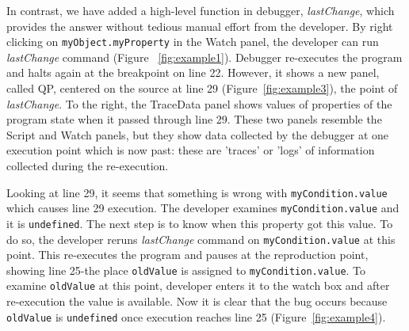 \documentclass[runningheads,a4paper]{llncs}
\begin{document}
In contrast, we have added a high-level function in debugger,
\textit{lastChange}, which provides the answer without tedious manual
effort from the developer. By right clicking on
\texttt{myObject.myProperty} in the Watch panel, the developer can run
\textit{lastChange} command (Figure ~\ref{fig:example1}). Debugger
re-executes the program and halts again at the breakpoint on line 22.
However, it shows a new panel, called QP, centered on the source at line 29
(Figure~\ref{fig:example3}), the point of \textit{lastChange}.  To
the right, the TraceData panel shows values of properties of the
program state when it passed through line 29.  These two panels
resemble the Script and Watch panels, but they show data collected by
the debugger at one execution point which is now past: these are
'traces' or 'logs' of information collected during the re-execution.

Looking at line 29, it seems that something is wrong with
\texttt{myCondition.value} which causes line 29 execution. The
developer examines \texttt{myCondition.value} and it is
\texttt{undefined}. The next step is to know when this property got
this value. To do so, the developer reruns \textit{lastChange} command
on \texttt{myCondition.value} at this point. This re-executes the
program and pauses at the reproduction point,  showing line 25-the
place \texttt{oldValue} is assigned to
\texttt{myCondition.value}. To examine \texttt{oldValue}
 at this point, developer enters it to the watch box and after re-execution the value
 is available. Now it is clear that the bug occurs because \texttt{oldValue} is
\texttt{undefined} once execution reaches line 25 (Figure~\ref{fig:example4}).
\end{document}
